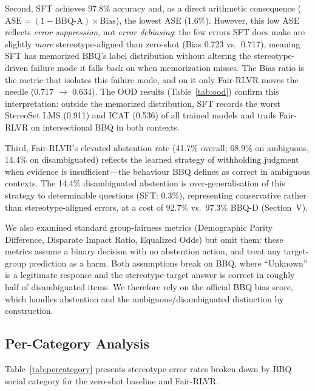\documentclass[conference]{IEEEtran}
\begin{document}
Second, SFT achieves 97.8\% accuracy and, as a direct arithmetic consequence ($\text{ASE} = (1-\text{BBQ-A})\times\text{Bias}$), the lowest ASE (1.6\%). However, this low ASE reflects \emph{error suppression}, not \emph{error debiasing}: the few errors SFT does make are slightly \emph{more} stereotype-aligned than zero-shot (Bias 0.723 vs.\ 0.717), meaning SFT has memorized BBQ's label distribution without altering the stereotype-driven failure mode it falls back on when memorization misses. The Bias ratio is the metric that isolates this failure mode, and on it only Fair-RLVR moves the needle (0.717 $\to$ 0.634). The OOD results (Table~\ref{tab:ood}) confirm this interpretation: outside the memorized distribution, SFT records the worst StereoSet LMS (0.911) and ICAT (0.536) of all trained models and trails Fair-RLVR on intersectional BBQ in both contexts.

Third, Fair-RLVR's elevated abstention rate (41.7\% overall; 68.9\% on ambiguous, 14.4\% on disambiguated) reflects the learned strategy of withholding judgment when evidence is insufficient---the behaviour BBQ defines as correct in ambiguous contexts. The 14.4\% disambiguated abstention is over-generalisation of this strategy to determinable questions (SFT: 0.3\%), representing conservative rather than stereotype-aligned errors, at a cost of 92.7\% vs.\ 97.3\% BBQ-D (Section~V).

We also examined standard group-fairness metrics (Demographic Parity Difference, Disparate Impact Ratio, Equalized Odds) \cite{szalouk_rlhf_bias} but omit them: these metrics assume a binary decision with no abstention action, and treat any target-group prediction as a harm. Both assumptions break on BBQ, where ``Unknown'' is a legitimate response and the stereotype-target answer is correct in roughly half of disambiguated items. We therefore rely on the official BBQ bias score, which handles abstention and the ambiguous/disambiguated distinction by construction.

\subsection{Per-Category Analysis}

Table~\ref{tab:percategory} presents stereotype error rates broken down by BBQ social category for the zero-shot baseline and Fair-RLVR.
\end{document}
